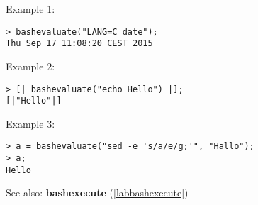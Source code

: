 \noindent Example 1: 
\begin{center}\begin{minipage}{15cm}\begin{Verbatim}[frame=single]
> bashevaluate("LANG=C date");
Thu Sep 17 11:08:20 CEST 2015
\end{Verbatim}
\end{minipage}\end{center}
\noindent Example 2: 
\begin{center}\begin{minipage}{15cm}\begin{Verbatim}[frame=single]
> [| bashevaluate("echo Hello") |];
[|"Hello"|]
\end{Verbatim}
\end{minipage}\end{center}
\noindent Example 3: 
\begin{center}\begin{minipage}{15cm}\begin{Verbatim}[frame=single]
> a = bashevaluate("sed -e 's/a/e/g;'", "Hallo");
> a;
Hello
\end{Verbatim}
\end{minipage}\end{center}
See also: \textbf{bashexecute} (\ref{labbashexecute})
